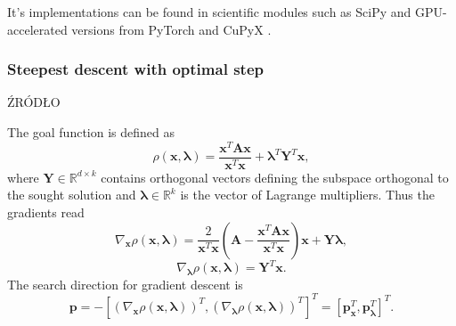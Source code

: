 It's implementations can be found in scientific modules such as SciPy \cite{scipy_lobpcg} and GPU-accelerated versions from PyTorch \cite{torch_lobpcg} and CuPyX \cite{cupy_lobpcg}.

\subsubsection{Steepest descent with optimal step}
ŹRÓDŁO \cite{pgd}

The goal function is defined as
\begin{equation}
	\rho\left(\mathbf{x}, \bm{\lambda} \right) = \frac{\mathbf{x}^T\mathbf{A}\mathbf{x}}{\mathbf{x}^T\mathbf{x}} + \bm{\lambda}^T \mathbf{Y}^T \mathbf{x}, 
\end{equation}
where $\mathbf{Y}\in\mathbb{R}^{d \times k}$ contains orthogonal vectors defining the subspace orthogonal to the sought solution and $\bm{\lambda}\in\mathbb{R}^k$ is the vector of Lagrange multipliers.
Thus the gradients read
\begin{equation}
	\nabla_{\mathbf{x}}\rho\left(\mathbf{x},\bm{\lambda}\right) = \frac{2}{\mathbf{x}^T\mathbf{x}}\left(\mathbf{A}-\frac{\mathbf{x}^T\mathbf{A}\mathbf{x}}{\mathbf{x}^T\mathbf{x}}\right)\mathbf{x} + \mathbf{Y}\bm{\lambda},
\end{equation}
\begin{equation}
	\nabla_{\bm{\lambda}}\rho\left(\mathbf{x},\bm{\lambda}\right) = \mathbf{Y}^T\mathbf{x}.
\end{equation}
The search direction for gradient descent is
\begin{equation}
	\mathbf{p}=-\left[\left(\nabla_{\mathbf{x}}\rho\left(\mathbf{x},\bm{\lambda}\right)\right)^T, \left(\nabla_{\bm{\lambda}}\rho\left(\mathbf{x},\bm{\lambda}\right)\right)^T\right]^T = \left[\mathbf{p}_{\mathbf{x}}^T,\mathbf{p}_{\bm{\lambda}}^T\right]^T.
\end{equation}

